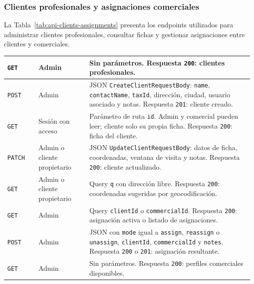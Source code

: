 \subsubsection{Clientes profesionales y asignaciones comerciales}

La Tabla~\ref{tab:api-clients-assignments} presenta los endpoints utilizados para administrar clientes profesionales, consultar fichas y gestionar asignaciones entre clientes y comerciales.

{\apiTableSetup
{}
\tablefirsthead{\apiHeader}
\tablehead{\apiHeader}
\begin{supertabular}{|A{0.10\textwidth}|A{0.27\textwidth}|A{0.15\textwidth}|A{0.38\textwidth}|}
\texttt{GET} &  & Admin & Sin parámetros. Respuesta \texttt{200}: clientes profesionales.\\
\hline
\texttt{POST} &  & Admin & JSON \texttt{CreateClientRequestBody}: \texttt{name}, \texttt{contactName}, \texttt{taxId}, dirección, ciudad, usuario asociado y notas. Respuesta \texttt{201}: cliente creado.\\
\hline
\texttt{GET} &  & Sesión con acceso & Parámetro de ruta \texttt{id}. Admin y comercial pueden leer; cliente solo su propia ficha. Respuesta \texttt{200}: ficha del cliente.\\
\hline
\texttt{PATCH} &  & Admin o cliente propietario & JSON \texttt{UpdateClientRequestBody}: datos de ficha, coordenadas, ventana de visita y notas. Respuesta \texttt{200}: cliente actualizado.\\
\hline
\texttt{GET} &  & Admin o cliente propietario & Query \texttt{q} con dirección libre. Respuesta \texttt{200}: coordenadas sugeridas por geocodificación.\\
\hline
\texttt{GET} &  & Admin & Query \texttt{clientId} o \texttt{commercialId}. Respuesta \texttt{200}: asignación activa o listado de asignaciones.\\
\hline
\texttt{POST} &  & Admin & JSON con \texttt{mode} igual a \texttt{assign}, \texttt{reassign} o \texttt{unassign}, \texttt{clientId}, \texttt{commercialId} y \texttt{notes}. Respuesta \texttt{200} o \texttt{201}: asignación resultante.\\
\hline
\texttt{GET} &  & Admin & Sin parámetros. Respuesta \texttt{200}: perfiles comerciales disponibles.\\

\end{supertabular}}
